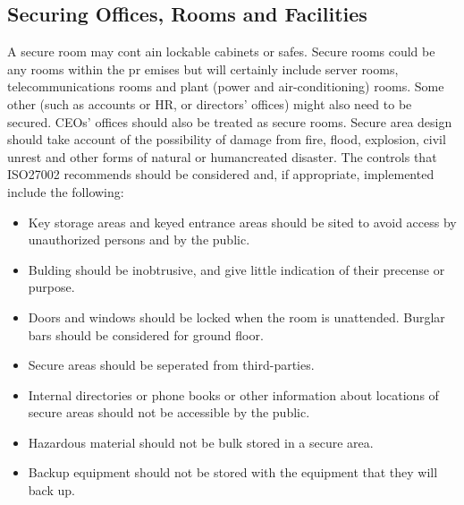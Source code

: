 \subsection{Securing Offices, Rooms and Facilities}
A secure room may cont ain lockable cabinets or safes. Secure rooms could be any
rooms within the pr emises but  will certainly include server rooms,
telecommunications rooms  and plant  (power and air-conditioning) rooms. Some 
other (such as accounts or HR, or directors’ offices) might also need to be 
secured. CEOs’ offices should also be treated as secure rooms. Secure  area 
design should take account of the possibility of damage from fire, flood, 
explosion, civil unrest and other forms of natural or humancreated disaster.
The controls that ISO27002 recommends should be considered and, if  appropriate,
implemented include the following:
\begin{itemize}
    \item  Key storage areas and keyed entrance areas should be sited to
     avoid access by unauthorized persons and by the public.

     \item Bulding should be inobtrusive, and give little indication of their 
     precense or purpose.

     \item Doors and windows should be locked when the room is unattended.
     Burglar bars should be considered for ground floor.

     \item Secure areas should be seperated from third-parties. 

     \item Internal directories or phone books or other information about 
     locations of secure areas should not be accessible by the public.

     \item Hazardous material should not be bulk stored in a secure area.

     \item Backup equipment should not be stored with the equipment that they 
     will back up.
\end{itemize}


